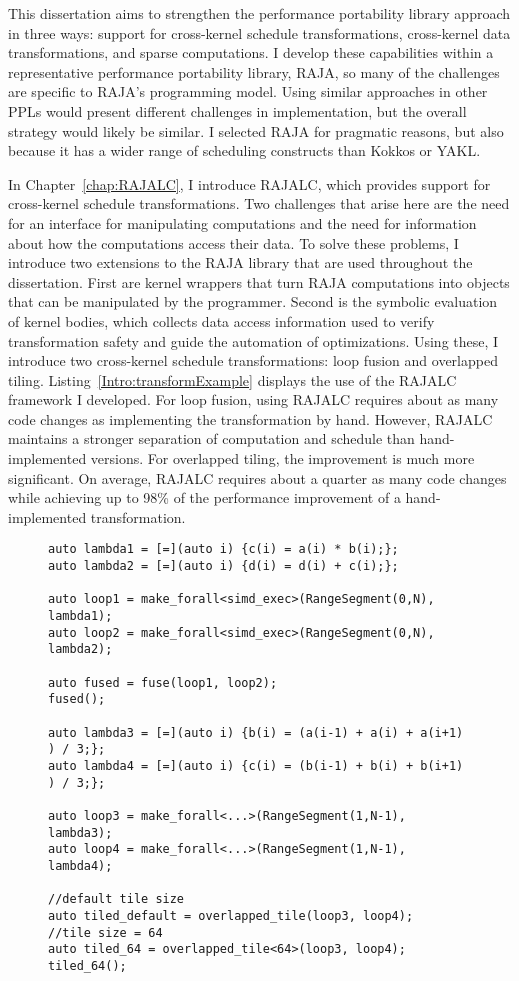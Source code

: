 This dissertation aims to strengthen the performance portability library approach in three ways: support for cross-kernel schedule transformations, cross-kernel data transformations, and sparse computations.
I develop these capabilities within a representative performance portability library, RAJA\@, so many of the challenges are specific to RAJA's programming model.
Using similar approaches in other PPLs would present different challenges in implementation, but the overall strategy would likely be similar.
I selected RAJA for pragmatic reasons, but also because it has a wider range of scheduling constructs than Kokkos or YAKL\@.

In Chapter~\ref{chap:RAJALC}, I introduce RAJALC, which provides support for cross-kernel schedule transformations.
Two challenges that arise here are the need for an interface for manipulating computations and the need for information about how the computations access their data.
To solve these problems, I introduce two extensions to the RAJA library that are used throughout the dissertation.
First are kernel wrappers that turn RAJA computations into objects that can be manipulated by the programmer.
Second is the symbolic evaluation of kernel bodies, which collects data access information used to verify transformation safety and guide the automation of optimizations.
Using these, I introduce two cross-kernel schedule transformations: loop fusion and overlapped tiling. 
Listing~\ref{Intro:transformExample} displays the use of the RAJALC framework I developed.
For loop fusion, using RAJALC requires about as many code changes as implementing the transformation by hand.
However, RAJALC maintains a stronger separation of computation and schedule than hand-implemented versions.
For overlapped tiling, the improvement is much more significant.
On average, RAJALC requires about a quarter as many code changes while achieving up to 98\% of the performance improvement of a hand-implemented transformation.
\begin{figure}[t]
\begin{lstlisting}[caption={Using the \texttt{fuse} and \texttt{overlapped\_tile} transformations.}, label={Intro:transformExample}]
auto lambda1 = [=](auto i) {c(i) = a(i) * b(i);};
auto lambda2 = [=](auto i) {d(i) = d(i) + c(i);};

auto loop1 = make_forall<simd_exec>(RangeSegment(0,N), lambda1);
auto loop2 = make_forall<simd_exec>(RangeSegment(0,N), lambda2);

auto fused = fuse(loop1, loop2);
fused();

auto lambda3 = [=](auto i) {b(i) = (a(i-1) + a(i) + a(i+1) ) / 3;};
auto lambda4 = [=](auto i) {c(i) = (b(i-1) + b(i) + b(i+1) ) / 3;};

auto loop3 = make_forall<...>(RangeSegment(1,N-1), lambda3);
auto loop4 = make_forall<...>(RangeSegment(1,N-1), lambda4);

//default tile size
auto tiled_default = overlapped_tile(loop3, loop4);
//tile size = 64
auto tiled_64 = overlapped_tile<64>(loop3, loop4);
tiled_64();
\end{lstlisting}
\end{figure}

